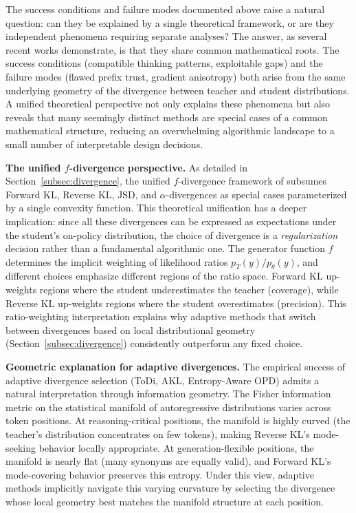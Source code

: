 \documentclass{article} %
\newcommand{\ptheta}{p_\theta}
\newcommand{\pteacher}{p_T}
\begin{document}
The success conditions and failure modes documented above raise a natural question: can they be explained by a single theoretical framework, or are they independent phenomena requiring separate analyses? The answer, as several recent works demonstrate, is that they share common mathematical roots. The success conditions (compatible thinking patterns, exploitable gaps) and the failure modes (flawed prefix trust, gradient anisotropy) both arise from the same underlying geometry of the divergence between teacher and student distributions. A unified theoretical perspective not only explains these phenomena but also reveals that many seemingly distinct methods are special cases of a common mathematical structure, reducing an overwhelming algorithmic landscape to a small number of interpretable design decisions.

\textbf{The unified $f$-divergence perspective.}
As detailed in Section~\ref{subsec:divergence}, the unified $f$-divergence framework of \citet{2307.15190} subsumes Forward KL, Reverse KL, JSD, and $\alpha$-divergences as special cases parameterized by a single convexity function. This theoretical unification has a deeper implication: since all these divergences can be expressed as expectations under the student's on-policy distribution, the choice of divergence is a \emph{regularization} decision rather than a fundamental algorithmic one. The generator function $f$ determines the implicit weighting of likelihood ratios $\pteacher(y)/\ptheta(y)$, and different choices emphasize different regions of the ratio space. Forward KL up-weights regions where the student underestimates the teacher (coverage), while Reverse KL up-weights regions where the student overestimates (precision). This ratio-weighting interpretation explains why adaptive methods that switch between divergences based on local distributional geometry (Section~\ref{subsec:divergence}) consistently outperform any fixed choice.

\textbf{Geometric explanation for adaptive divergences.}
The empirical success of adaptive divergence selection (ToDi, AKL, Entropy-Aware OPD) admits a natural interpretation through information geometry. The Fisher information metric on the statistical manifold of autoregressive distributions varies across token positions. At reasoning-critical positions, the manifold is highly curved (the teacher's distribution concentrates on few tokens), making Reverse KL's mode-seeking behavior locally appropriate. At generation-flexible positions, the manifold is nearly flat (many synonyms are equally valid), and Forward KL's mode-covering behavior preserves this entropy. Under this view, adaptive methods implicitly navigate this varying curvature by selecting the divergence whose local geometry best matches the manifold structure at each position.
\end{document}

